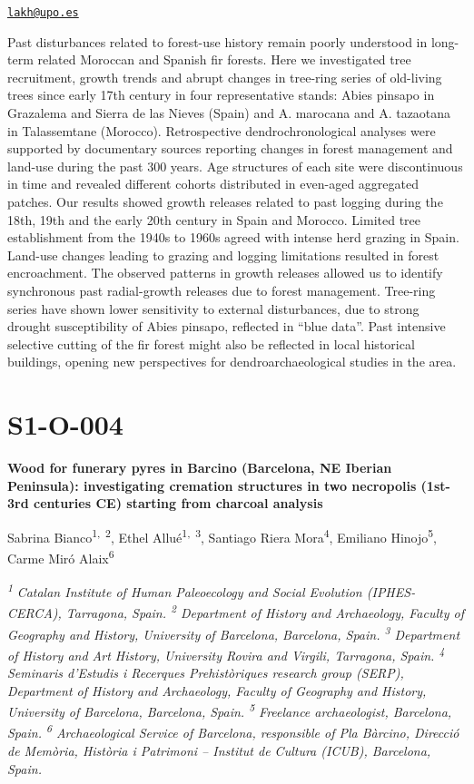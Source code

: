 \documentclass[
]{book}
\begin{document}
\href{mailto:lakh@upo.es}{\nolinkurl{lakh@upo.es}}

Past disturbances related to forest-use history remain poorly understood in long-term related Moroccan and Spanish fir forests. Here we investigated tree recruitment, growth trends and abrupt changes in tree-ring series of old-living trees since early 17th century in four representative stands: Abies pinsapo in Grazalema and Sierra de las Nieves (Spain) and A. marocana and A. tazaotana in Talassemtane (Morocco). Retrospective dendrochronological analyses were supported by documentary sources reporting changes in forest management and land-use during the past 300 years. Age structures of each site were discontinuous in time and revealed different cohorts distributed in even-aged aggregated patches. Our results showed growth releases related to past logging during the 18th, 19th and the early 20th century in Spain and Morocco. Limited tree establishment from the 1940s to 1960s agreed with intense herd grazing in Spain. Land-use changes leading to grazing and logging limitations resulted in forest encroachment. The observed patterns in growth releases allowed us to identify synchronous past radial-growth releases due to forest management. Tree-ring series have shown lower sensitivity to external disturbances, due to strong drought susceptibility of Abies pinsapo, reflected in ``blue data''. Past intensive selective cutting of the fir forest might also be reflected in local historical buildings, opening new perspectives for dendroarchaeological studies in the area.

\hypertarget{s1-o-004}{%
\section*{S1-O-004}\label{s1-o-004}}

\textbf{Wood for funerary pyres in Barcino (Barcelona, NE Iberian Peninsula): investigating cremation structures in two necropolis (1st-3rd centuries CE) starting from charcoal analysis}

Sabrina Bianco\textsuperscript{1,~2}, Ethel Allué\textsuperscript{1,~3}, Santiago Riera Mora\textsuperscript{4}, Emiliano Hinojo\textsuperscript{5}, Carme Miró Alaix\textsuperscript{6}

\textsuperscript{\emph{1}} \emph{Catalan Institute of Human Paleoecology and Social Evolution (IPHES-CERCA), Tarragona, Spain. \textsuperscript{2} Department of History and Archaeology, Faculty of Geography and History, University of Barcelona, Barcelona, Spain. \textsuperscript{3} Department of History and Art History, University Rovira and Virgili, Tarragona, Spain. \textsuperscript{4} Seminaris d'Estudis i Recerques Prehistòriques research group (SERP), Department of History and Archaeology, Faculty of Geography and History, University of Barcelona, Barcelona, Spain. \textsuperscript{5} Freelance archaeologist, Barcelona, Spain. \textsuperscript{6} Archaeological Service of Barcelona, responsible of Pla Bàrcino, Direcció de Memòria, Història i Patrimoni -- Institut de Cultura (ICUB), Barcelona, Spain.}
\end{document}
